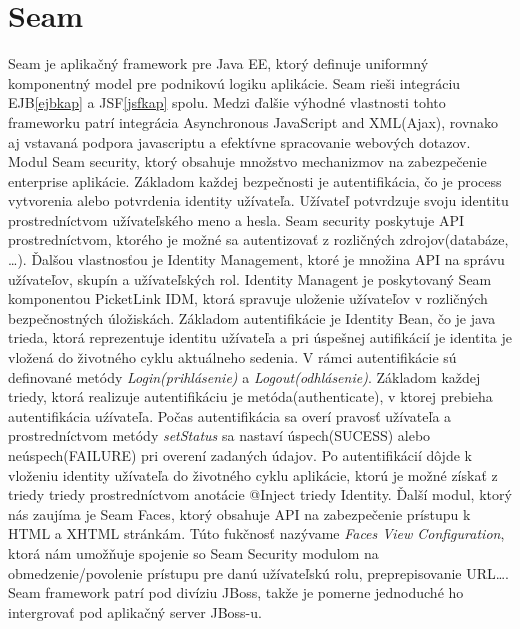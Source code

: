 \section{Seam}\label{seamkap}
Seam je aplikačný framework pre Java EE, ktorý definuje uniformný komponentný model pre podnikovú logiku aplikácie\cite{seambook}. Seam rieši integráciu EJB\ref{ejbkap} a JSF\ref{jsfkap} spolu. Medzi ďalšie výhodné vlastnosti tohto frameworku patrí integrácia Asynchronous JavaScript and XML(Ajax)\cite{ajaxbook}, rovnako aj vstavaná podpora javascriptu a efektívne spracovanie webových dotazov. \newline \indent Modul Seam security, ktorý obsahuje množstvo mechanizmov na zabezpečenie enterprise aplikácie. Základom každej bezpečnosti je autentifikácia, čo je process vytvorenia alebo potvrdenia identity užívateľa. Užívateľ potvrdzuje svoju identitu prostredníctvom užívateľského meno a hesla. Seam security poskytuje API prostredníctvom, ktorého je možné sa autentizovať z rozličných zdrojov(databáze, \ldots). Ďalšou vlastnosťou je Identity Management, ktoré je množina API na správu užívateľov, skupín a užívateľských rol. Identity Managent je poskytovaný Seam komponentou PicketLink IDM, ktorá spravuje uloženie užívateľov v rozličných bezpečnostných úložiskách. \newline \indent Základom autentifikácie je Identity Bean, čo je java trieda, ktorá reprezentuje identitu užívateľa a pri úspešnej autifikácií je identita je vložená do životného cyklu aktuálneho sedenia. V rámci autentifikácie sú definované metódy \emph{Login(prihlásenie)} a \emph{Logout(odhlásenie)}. Základom každej triedy, ktorá realizuje autentifikáciu je metóda(authenticate), v ktorej prebieha autentifikácia uźívateľa.
Počas autentifikácia sa overí pravosť užívateľa a prostredníctvom metódy \emph{setStatus} sa nastaví úspech(SUCESS) alebo neúspech(FAILURE) pri overení zadaných údajov. Po autentifikácií dôjde k vloženiu identity užívateľa do životného cyklu aplikácie, ktorú je možné získať z triedy triedy prostredníctvom anotácie @Inject triedy Identity.
\newline \indent Ďalší modul, ktorý nás zaujíma je Seam Faces, ktorý obsahuje API na zabezpečenie prístupu k HTML a XHTML stránkám. Túto fukčnosť nazývame \emph{Faces View Configuration}, ktorá nám umožňuje spojenie so Seam Security modulom na obmedzenie/povolenie prístupu pre danú užívateľskú rolu, preprepisovanie URL\ldots. Seam framework patrí pod divíziu JBoss, takže je pomerne jednoduché ho intergrovať pod aplikačný server JBoss-u. 



